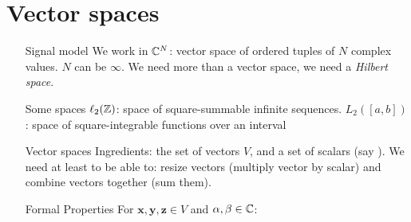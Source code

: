 \documentclass[11pt,a4paper]{article}
\begin{document}
\section{Vector spaces}
\begin{itemize}
    \item[Signal model]We work in $\mathbb{C}^N$: vector space  of ordered tuples of $N$ complex values. $N$ can be $\infty$. We need more than a vector space, we need a \textit{Hilbert space}.
    \item[Some spaces] $\ell_2(\mathbb{Z})$: space of square-summable infinite sequences. $L_2([a,b])$: space of square-integrable functions over an interval
    \item[Vector spaces]Ingredients: the set of vectors $V$, and a set of scalars (say \C). We need at least to be able to: resize vectors (multiply vector by scalar) and combine vectors together (sum them).
    \item[Formal Properties]For $\mathbf{x},\mathbf{y},\mathbf{z} \in V$ and $\alpha,\beta \in \mathbb{C}$:


\end{itemize}
\end{document}
